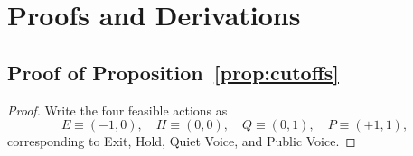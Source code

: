 \documentclass[11pt]{article}
\newcommand{\1}{\mathbf{1}}
\begin{document}
\section{Proofs and Derivations}
\label{app:proofs}

\subsection{Proof of Proposition~\ref{prop:cutoffs}}
\label{app:proof-cutoffs}

\begin{proof}
Write the four feasible actions as
\[
E\equiv(-1,0),\quad H\equiv(0,0),\quad Q\equiv(0,1),\quad P\equiv(+1,1),
\]
corresponding to Exit, Hold, Quiet Voice, and Public Voice.


\end{proof}
\end{document}
